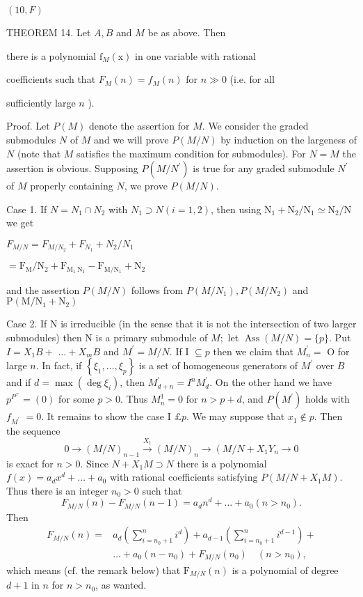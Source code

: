 $(10, F)$

THEOREM 14. Let $A, B$ and $M$ be as above. Then

there is a polynomial $\mathrm{f}_{M}(\mathrm{x})$ in one variable with rational

coefficients such that $F_{M}(n)=f_{M}(n)$ for $n \gg 0$ (i.e. for all

sufficiently large $n$ ).

Proof. Let $P(M)$ denote the assertion for $M$. We consider the graded submodules $N$ of $M$ and we will prove $P(M / N)$ by induction on the largeness of $N$ (note that $M$ satisfies the maximum condition for submodules). For $N=M$ the assertion is obvious. Supposing $P\left(M / N^{\prime}\right)$ is true for any graded submodule $N^{\prime}$ of $M$ properly containing $N$, we prove $P(M / N)$.

Case 1. If $N=N_{1} \cap N_{2}$ with $N_{1} \supset N(i=1,2)$, then using $\mathrm{N}_{1}+\mathrm{N}_{2} / \mathrm{N}_{1} \simeq \mathrm{N}_{2} / \mathrm{N}$ we get

$F_{M / N}=F_{M / N_{2}}+F_{N_{1}}+N_{2} / N_{1}$

$=\mathrm{F}_{\mathrm{M}} / \mathrm{N}_{2}+\mathrm{F}_{\mathrm{M}_{1} \mathrm{~N}_{1}}-\mathrm{F}_{\mathrm{M} / \mathrm{N}_{1}}+\mathrm{N}_{2}$

and the assertion $P(M / N)$ follows from $P\left(M / N_{1}\right), P\left(M / N_{2}\right)$ and $\mathrm{P}\left(\mathrm{M} / \mathrm{N}_{1}+\mathrm{N}_{2}\right)$

Case 2. If $\mathrm{N}$ is irreducible (in the sense that it is not the intersection of two larger submodules) then $\mathrm{N}$ is a primary submodule of $M ;$ let $\operatorname{Ass}(M / N)=\{p\}$. Put $I=X_{1} B+$ $\ldots+X_{m} B$ and $M^{\prime}=M / N$. If I $\subseteq p$ then we claim that $M_{n}^{\prime}=$ O for large $n$. In fact, if $\left\{\xi_{1}, \ldots, \xi_{p}\right\}$ is a set of homogeneous generators of $M^{\prime}$ over $B$ and if $d=\max \left(\operatorname{deg} \xi_{i}\right)$, then $M_{d+n}^{\prime}=I^{n} M_{d}^{\prime}$. On the other hand we have $p^{P^{\top}}=(0)$ for some $p>0$. Thus $M_{n}^{1}=0$ for $n>p+d$, and $P\left(M^{\prime}\right)$ holds with $f_{M^{\prime}}$ $=0$. It remains to show the case I $£ p$. We may suppose that $x_{1} \notin p$. Then the sequence
$$
0 \rightarrow(M / N)_{n-1} \stackrel{X_{1}}{\rightarrow}(M / N)_{n} \rightarrow\left(M / N+X_{1} Y_{n} \rightarrow 0\right.
$$
is exact for $n>0$. Since $N+X_{1} M \supset N$ there is a polynomial $f(x)=a_{d} x^{d}+\ldots+a_{0}$ with rational coefficients satisfying $P\left(M / N+X_{1} M\right)$. Thus there is an integer $n_{0}>0$ such that
$$
F_{M / N}(n)-F_{M / N}(n-1)=a_{d} n^{d}+\ldots+a_{0}\left(n>n_{0}\right) .
$$
Then
$$
\begin{aligned}
F_{M / N}(n)=& a_{d}\left(\sum_{i=n_{0}+1}^{n} i^{d}\right)+a_{d-1}\left(\sum_{i=n_{0}+1}^{n} i^{d-1}\right)+\\
& \ldots+a_{0}\left(n-n_{0}\right)+F_{M / N}\left(n_{0}\right) \quad\left(n>n_{0}\right),
\end{aligned}
$$
which means (cf. the remark below) that $\mathrm{F}_{M / N}(n)$ is a polynomial of degree $d+1$ in $n$ for $n>n_{0}$, as wanted.

